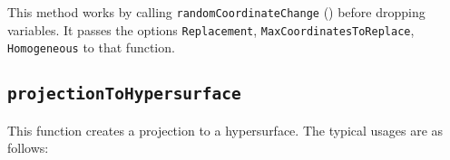 \documentclass[11pt]{amsart}
\theoremstyle{definition}
\begin{document}
\begin{comment}~~
  
  {{\small\color{blue}
\begin{verbatim}
i1 : R = ZZ/5[x, y, z, w];

i2 : I = ideal(x, y^2, w^3 + x^2);

i3 : genericProjection(2, R/I)	

                            ZZ                          ZZ
                            --[z, w]                    --[z, w]                        
                R           5                           5
o3 = (map(----------------,--------,{2y - w, - y - z}), --------)                       
             2   3    2        4                            4
        (x, y , w  + x )      z                            z
        
o3 : Sequence
\end{verbatim}}
    }}
\end{comment}


This method works by calling {\tt randomCoordinateChange} () before dropping variables.  It passes the options {\tt Replacement}, {\tt MaxCoordinatesToReplace}, {\tt Homogeneous} to that function.
\begin{comment}~~
  
  ~~
  
  {{\small\color{blue}
\begin{verbatim}
		
i2 : R = ZZ/5[x, y, z, w];

i3 : I = ideal(x, y^2, w^3 + x^2);

o3 : Ideal of R

i4 :genericProjection(2, I, Replacement => Binomial)

            ZZ                                   4
o4 = (map(R,--[z, w],{x + 2z, - 2y + w}), ideal w )                                     
            5
            
o4 : Sequence
\end{verbatim}}
    }}
\end{comment}

\subsection{\tt projectionToHypersurface} This function creates a projection to a hypersurface. The typical usages are as follows: 
\end{document}
